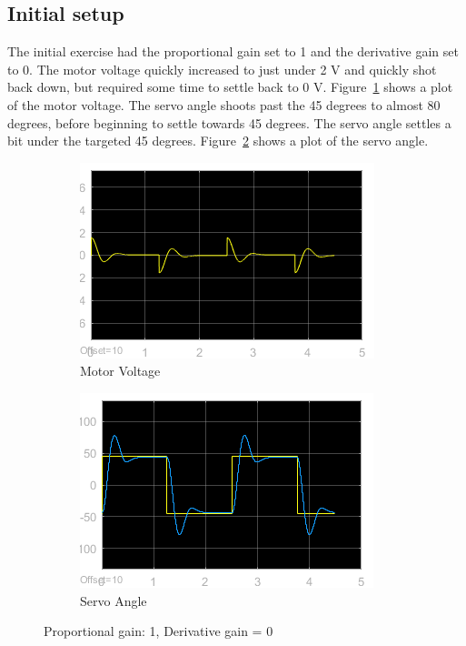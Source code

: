 \documentclass[12pt]{article}
\begin{document}
\subsection*{Initial setup} %
The initial exercise had the proportional gain set to 1 and the derivative gain set to 0. The motor voltage quickly increased to just under 2 V and quickly shot back down, but required some time to settle back to 0 V. Figure~\ref{fig:vii_volt} shows a plot of the motor voltage. The servo angle shoots past the 45 degrees to almost 80 degrees, before beginning to settle towards 45 degrees. The servo angle settles a bit under the targeted 45 degrees. Figure~\ref{fig:vii_angle} shows a plot of the servo angle.
\begin{figure}[h!]
    \centering
    \begin{subfigure}[b]{0.49\textwidth}
        \includegraphics[width=\textwidth]{vii_voltage}    
        \caption{\label{fig:vii_volt}Motor Voltage}    
    \end{subfigure}
    \begin{subfigure}[b]{0.49\textwidth}
        \includegraphics[width=\textwidth]{vii_angle}
        \caption{\label{fig:vii_angle}Servo Angle}
    \end{subfigure}
    \caption{\label{fig:vii}Proportional gain: 1, Derivative gain = 0}
\end{figure}
\end{document}
